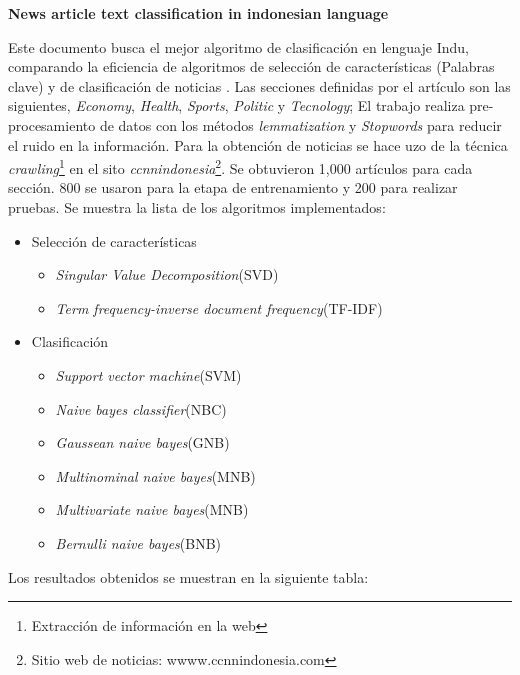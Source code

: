 \begin{large}
	 \textbf{News article text classification in indonesian language}
	 \\
\end{large}

Este documento busca el mejor algoritmo de clasificación en lenguaje Indu, comparando la eficiencia de algoritmos de selección de características (Palabras clave) y de clasificación de noticias \citep{CD8}. Las secciones definidas por el artículo son las siguientes, \textit{Economy}, \textit{Health}, \textit{Sports}, \textit{Politic} y \textit{Tecnology}; El trabajo realiza pre-procesamiento de datos con  los métodos \textit{lemmatization} y \textit{Stopwords} para reducir el ruido en la información. Para la obtención de noticias se hace uzo de la técnica \textit{crawling}\footnote{Extracción de información en la web} en el sito \textit{ccnnindonesia}\footnote{Sitio web de noticias: wwww.ccnnindonesia.com}. Se obtuvieron 1,000 artículos para cada sección. 800 se usaron para la etapa de entrenamiento y 200 para realizar pruebas. Se muestra la lista de los algoritmos implementados:

\begin{itemize}
	\item Selección de características
	\begin{itemize}
		\item \textit{Singular Value Decomposition}(SVD)
		\item \textit{Term frequency-inverse document frequency}(TF-IDF)
	\end{itemize}

	\item Clasificación
	\begin{itemize}
		\item \textit{Support vector machine}(SVM)
		\item \textit{Naive bayes classifier}(NBC)
		\item \textit{Gaussean naive bayes}(GNB)
		\item \textit{Multinominal naive bayes}(MNB) 
		\item \textit{Multivariate naive bayes}(MNB)
		\item \textit{Bernulli naive bayes}(BNB)
	\end{itemize}
\end{itemize}


Los resultados obtenidos se muestran en la siguiente tabla:\\

